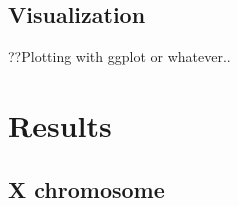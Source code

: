 \documentclass[
journal=jacsat, %
manuscript=article]{achemso}
\begin{document}
\subsection{Visualization}
??Plotting with ggplot or whatever..

\clearpage
\section{Results}

\subsection{X chromosome}


\def \restrip {.55}

\begin{center}
    \begin{figure}

\end{figure}
\end{center}
\end{document}
